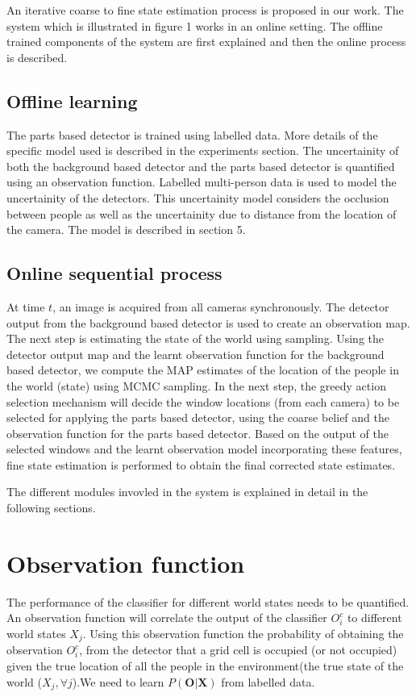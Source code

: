 \documentclass[10pt,twocolumn,letterpaper]{article}
\begin{document}
An iterative coarse to fine state estimation process is proposed in our work. The system which is illustrated in figure 1 works in an online setting. The offline trained components of the system are first explained and then the online process is described.
\subsection{Offline learning}
The parts based detector is trained using labelled data. More details of the specific model used is described in the experiments section. The uncertainity of both the background based detector and the parts based detector is quantified using an observation function. Labelled multi-person data is used to model the uncertainity of the detectors. This uncertainity model considers the occlusion between people as well as the uncertainity due to distance from the location of the camera. The model is described in section 5.
\subsection{Online sequential process}
At time $t $, an image is acquired from all cameras synchronously. The detector output from the background based detector is used to create an observation map. The next step is estimating the state of the world using sampling. Using the detector output map and the learnt observation function for the background based detector, we compute the MAP estimates of the location of the people in the world (state) using MCMC sampling. 
In the next step, the greedy action selection mechanism will
decide the window locations (from each camera) to be selected for applying the parts based detector, using the coarse belief and the observation function for the parts based detector. Based on the output of the selected windows and the learnt observation model incorporating these features, fine state estimation is performed to obtain the final corrected state estimates.

The different modules invovled in the system is explained in detail in the following sections.

\section{Observation function}
The performance of the classifier for different world states needs
to be quantified. An observation function will correlate the output of the classifier $O^{c}_{i}$ to different world
states $X_{j}$.
Using this  observation function the probability of
obtaining the observation $ O^{c}_{i} $, from the detector that a grid cell is occupied (or not occupied) given the true location of all the people in the environment(the true state of the world ($ X_{j},\forall j $).We need to learn $ P(\textbf{O}|\textbf{X})  $ from labelled data.
\end{document}
